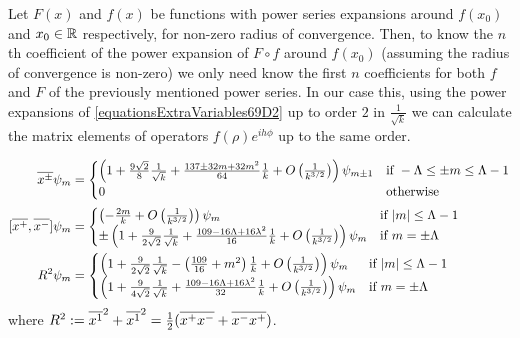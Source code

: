 \begin{remark}\label{remarkPowerSeries}
Let $F(x)$ and $f(x)$ be functions with power series expansions around $f(x_0)$ and $x_0 \in \mathbb{R}$ respectively, for non-zero radius of convergence. Then, to know the $n$th coefficient of the power expansion of $F \circ f$ around $f(x_0)$ (assuming the radius of convergence is non-zero) we only need know the first $n$ coefficients for both $f$ and $F$ of the previously mentioned power series. In our case this, using the power expansions of \eqref{equationsExtraVariables69D2} up to order $2$ in $\frac{1}{\sqrt{k}}$ we can calculate the matrix elements of operators $f(\rho) e^{ih\phi}$ up to the same order.
\end{remark}

\begin{proposition}
\begin{align}
    \cut{x^\pm}  \psi_m
        &= \begin{cases}
        \left(1 + \frac{9 \sqrt{2}}{8} \frac{1}{\sqrt{k}} + \frac{137 \pm 32m + 32m^2}{64} \frac{1}{k} + O\left(\frac{1}{k^{3/2}}\right) \right) \psi_{m \pm 1} & \text{if } -\Lambda \leq \pm m \leq \Lambda -1
        \\
        0 & \text{otherwise}
        \end{cases}\\
    [\cut{x^+}, \cut{x^-}]  \psi_m
        &= \begin{cases}
        \left( -\frac{2m}{k}  + O\left(\frac{1}{k^{3/2}}\right) \right) \psi_{m} & \text{if } |m| \leq \Lambda -1
        \\
        \pm \left( 1 + \frac{9}{2\sqrt{2}} \frac{1}{\sqrt{k}} +  \frac{109-16\Lambda + 16\lambda^2}{16} \frac{1}{k} + O\left(\frac{1}{k^{3/2}}\right) \right) \psi_{m} & \text{if } m = \pm \Lambda 
        \end{cases}\\
    R^2  \psi_m
        &= \begin{cases}
        \left( 1+ \frac{9}{2\sqrt{2}} \frac{1}{\sqrt{k}} -\left(\frac{109}{16}+m^2\right) \frac{1}{k}  + O\left(\frac{1}{k^{3/2}}\right) \right) \psi_{m} & \text{if } |m| \leq \Lambda -1
        \\
        \left( 1+ \frac{9}{4\sqrt{2}} \frac{1}{\sqrt{k}} + \frac{109-16\Lambda+16\lambda^2}{32} \frac{1}{k} + O\left(\frac{1}{k^{3/2}}\right) \right) \psi_{m} & \text{if } m = \pm \Lambda 
        \end{cases}
\end{align}
where $R^2 := \overline{x^1}^2 + \overline{x^1}^2 = \frac{1}{2}(\overline{x^+}\overline{x^-} + \overline{x^-}\overline{x^+})$.
\end{proposition}
